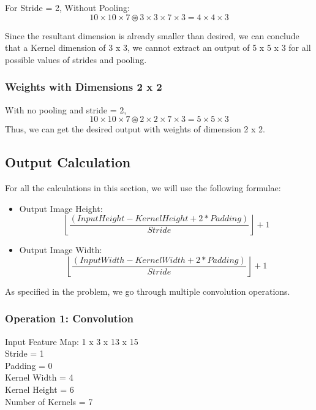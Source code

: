 \documentclass{article}
\begin{document}
For Stride = 2, Without Pooling:
\begin{equation}
    10 \times 10 \times 7 \circledast 3 \times 3 \times 7 \times 3 = 4 \times 4 \times 3
\end{equation}

Since the resultant dimension is already smaller than desired, we can conclude that a Kernel dimension of 3 x 3, we cannot extract an output of 5 x 5 x 3 for all possible values of strides and pooling.

\subsubsection{Weights with Dimensions 2 x 2}
With no pooling and stride = 2,
\begin{equation}
    10 \times 10 \times 7 \circledast 2 \times 2 \times 7 \times 3 = 5 \times 5 \times 3
\end{equation}
Thus, we can get the desired output with weights of dimension 2 x 2.

\subsection{Output Calculation}
For all the calculations in this section, we will use the following formulae:

    \begin{itemize}
        \item Output Image Height: \begin{equation}
            \left\lfloor \frac{(Input Height - Kernel Height + 2 * Padding)}{Stride} \right\rfloor + 1
            \label{eq:out-height}
        \end{equation}
         \item Output Image Width: \begin{equation}
            \left\lfloor \frac{(Input Width - Kernel Width + 2 * Padding)}{Stride} \right\rfloor + 1
            \label{eq:out-width}
         \end{equation}
    \end{itemize}

As specified in the problem, we go through multiple convolution operations.

\subsubsection{Operation 1: Convolution}
Input Feature Map: 1 x 3 x 13 x 15 \\
Stride = 1 \\
Padding = 0 \\
Kernel Width = 4 \\
Kernel Height = 6 \\
Number of Kernels = 7 \\
\end{document}
